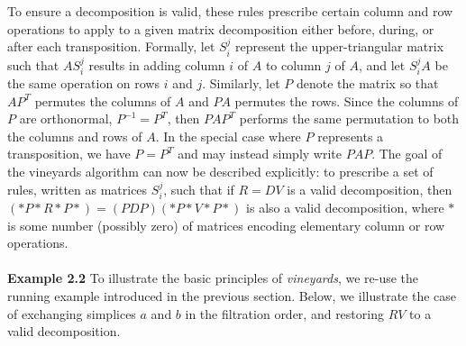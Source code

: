 \documentclass[sn-mathphys]{sn-jnl}
\begin{document}
To ensure a decomposition is valid, these rules prescribe certain column and row operations to apply to a given matrix decomposition either before, during, or after each transposition.   
Formally, let $S_{i}^j$ represent the upper-triangular matrix such that $A S_{i}^j$ results in adding column $i$ of $A$ to column $j$ of $A$, and let $S_{i}^j A$ be the same operation on rows $i$ and $j$.
Similarly, let $P$ denote the matrix so that $A P^T$ permutes the columns of $A$ and $P A$ permutes the rows.
Since the columns of $P$ are orthonormal, $P^{-1} = P^T$, then $P A P^T$ performs the same permutation to both the columns and rows of $A$. In the special case where $P$ represents a transposition, we have $P = P^T$ and may instead simply write $P A P$. 
The goal of the vineyards algorithm can now be described explicitly: to prescribe a set of rules, written as matrices $S_{i}^{j}$, such that if $R = D V$ is a valid decomposition, then $(\ast P \ast R \ast P \ast) = (PDP)(\ast P\ast V \ast P \ast)$ is also a valid decomposition, where $\ast$ is some number (possibly zero) of matrices encoding elementary column or row operations. 
\\
\\
\noindent 
\textbf{Example 2.2} To illustrate the basic principles of \emph{vineyards}, we re-use the running example introduced in the previous section. Below, we illustrate the case of exchanging simplices $a$ and $b$ in the filtration order, and restoring $RV$ to a valid decomposition. 
\end{document}
